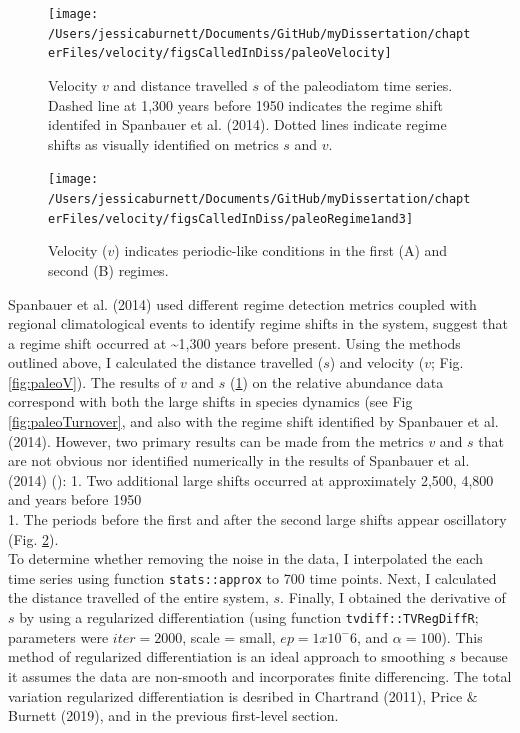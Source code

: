 \documentclass[12pt,twoside,openany]{reedthesis}
\begin{document}
\begin{figure}
\texttt{[image: /Users/jessicaburnett/Documents/GitHub/myDissertation/chapterFiles/velocity/figsCalledInDiss/paleoVelocity]} \caption{Velocity $v$ and distance travelled $s$ of the paleodiatom time series. Dashed line at 1,300 years before 1950 indicates the regime shift identifed in Spanbauer et al. (2014). Dotted lines indicate regime shifts as visually identified on metrics $s$ and $v$.}\label{fig:paleoVelocity}
\end{figure}
\begin{figure}
\texttt{[image: /Users/jessicaburnett/Documents/GitHub/myDissertation/chapterFiles/velocity/figsCalledInDiss/paleoRegime1and3]} \caption{Velocity ($v$) indicates periodic-like conditions in the first (A) and second (B) regimes.}\label{fig:paleoRegime1and3}
\end{figure}
Spanbauer et al. (2014) used different regime detection metrics coupled with regional climatological events to identify regime shifts in the system, suggest that a regime shift occurred at \textasciitilde1,300 years before present. Using the methods outlined above, I calculated the distance travelled (\(s\)) and velocity (\(v\); Fig. \ref{fig:paleoV}). The results of \(v\) and \(s\) (\ref{fig:paleoVelocity}) on the relative abundance data correspond with both the large shifts in species dynamics (see Fig \ref{fig:paleoTurnover}, and also with the regime shift identified by Spanbauer et al. (2014). However, two primary results can be made from the metrics \(v\) and \(s\) that are not obvious nor identified numerically in the results of Spanbauer et al. (2014) ():
1. Two additional large shifts occurred at approximately 2,500, 4,800 and years before 1950\\
1. The periods before the first and after the second large shifts appear oscillatory (Fig. \ref{fig:paleoRegime1and3}).\\
To determine whether removing the noise in the data, I interpolated the each time series using function \texttt{stats::approx} to 700 time points. Next, I calculated the distance travelled of the entire system, \(s\). Finally, I obtained the derivative of \(s\) by using a regularized differentiation (using function \texttt{tvdiff::TVRegDiffR}; parameters were \(iter = 2000\), scale = small, \(ep = 1 x 10^-6\), and \(\alpha = 100\)). This method of regularized differentiation is an ideal approach to smoothing \(s\) because it assumes the data are non-smooth and incorporates finite differencing. The total variation regularized differentiation is desribed in Chartrand (2011), Price \& Burnett (2019), and in the previous first-level section.
\end{document}

